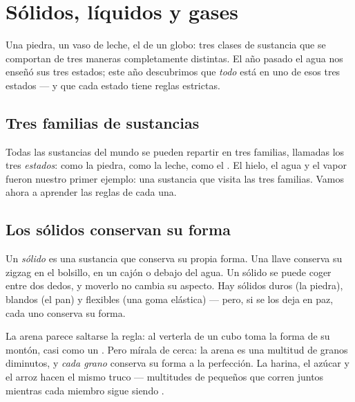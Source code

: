 \chapter{Sólidos, líquidos y gases}\label{ch:g3:solids-liquids-gases}

Una piedra, un vaso de leche, el  de un globo: tres clases de
sustancia que se comportan de tres maneras completamente distintas. El
año pasado el agua nos enseñó sus tres estados; este año descubrimos
que \emph{todo} está en uno de esos tres estados --- y que cada estado
tiene reglas estrictas.

\section{Tres familias de sustancias}

Todas las sustancias del mundo se pueden repartir en tres familias,
llamadas los tres \emph{estados}:  como la piedra,  como
la leche,  como el . El hielo, el agua y el vapor fueron
nuestro primer ejemplo: una sustancia que visita las tres familias.
Vamos ahora a aprender las reglas de cada una.

\section{Los sólidos conservan su forma}

\begin{definition}[Sólido]\label{def:g3:solids-liquids-gases:solid}
Un \emph{sólido} es una sustancia que conserva su propia
forma. Una llave conserva su zigzag en el bolsillo, en un cajón o
debajo del agua. Un sólido se puede coger entre dos dedos, y moverlo
no cambia su aspecto. Hay sólidos duros (la piedra), blandos (el pan)
y flexibles (una goma elástica) --- pero, si se los deja en paz, cada
uno conserva su forma.
\end{definition}

\begin{example}\label{ex:g3:solids-liquids-gases:sand}
La arena parece saltarse la regla: al verterla de un cubo toma la
forma de su montón, casi como un . Pero mírala de cerca: la
arena es una multitud de granos  diminutos, y \emph{cada
grano} conserva su forma a la perfección. La harina, el azúcar y el
arroz hacen el mismo truco --- multitudes de pequeños  que
corren juntos mientras cada miembro sigue siendo .
\end{example}

